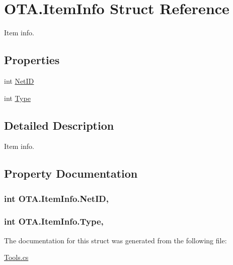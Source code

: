 \hypertarget{struct_o_t_a_1_1_item_info}{}\section{O\+T\+A.\+Item\+Info Struct Reference}
\label{struct_o_t_a_1_1_item_info}


Item info.  


\subsection*{Properties}
\begin{DoxyCompactItemize}
\item 
int \hyperlink{struct_o_t_a_1_1_item_info_a2403cefa9547802bb657c8fe298a7c51}{Net\+I\+D}
\item 
int \hyperlink{struct_o_t_a_1_1_item_info_a7850c2acb58eda89113a68b372247814}{Type}
\end{DoxyCompactItemize}


\subsection{Detailed Description}
Item info. 



\subsection{Property Documentation}
\hypertarget{struct_o_t_a_1_1_item_info_a2403cefa9547802bb657c8fe298a7c51}{}
\subsubsection[{Net\+I\+D}]{\setlength{\rightskip}{0pt plus 5cm}int O\+T\+A.\+Item\+Info.\+Net\+I\+D\hspace{0.3cm}{\ttfamily [get]}, {\ttfamily [set]}}\label{struct_o_t_a_1_1_item_info_a2403cefa9547802bb657c8fe298a7c51}
\hypertarget{struct_o_t_a_1_1_item_info_a7850c2acb58eda89113a68b372247814}{}
\subsubsection[{Type}]{\setlength{\rightskip}{0pt plus 5cm}int O\+T\+A.\+Item\+Info.\+Type\hspace{0.3cm}{\ttfamily [get]}, {\ttfamily [set]}}\label{struct_o_t_a_1_1_item_info_a7850c2acb58eda89113a68b372247814}


The documentation for this struct was generated from the following file\+:\begin{DoxyCompactItemize}
\item 
\hyperlink{_tools_8cs}{Tools.\+cs}\end{DoxyCompactItemize}
